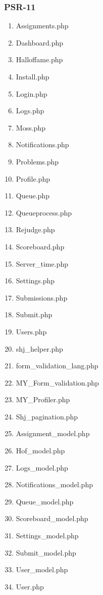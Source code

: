 \subsubsection{PSR-11}
\begin{enumerate}
	\item Assignments.php
	\item Dashboard.php
	\item Halloffame.php
	\item Install.php
	\item Login.php
	\item Logs.php
	\item Moss.php
	\item Notifications.php
	\item Problems.php
	\item Profile.php
	\item Queue.php
	\item Queueprocess.php
	\item Rejudge.php
	\item Scoreboard.php
	\item Server\_time.php
	\item Settings.php
	\item Submissions.php
	\item Submit.php
	\item Users.php
	\item shj\_helper.php
	\item form\_validation\_lang.php
	\item MY\_Form\_validation.php
	\item MY\_Profiler.php
	\item Shj\_pagination.php
	\item Assignment\_model.php
	\item Hof\_model.php
	\item Logs\_model.php
	\item Notifications\_model.php
	\item Queue\_model.php
	\item Scoreboard\_model.php
	\item Settings\_model.php
	\item Submit\_model.php
	\item User\_model.php
	\item User.php
\end{enumerate}


